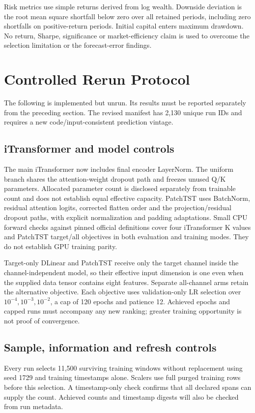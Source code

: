 \documentclass[onecolumn,journal,a4paper,11pt]{IEEEtran}
\begin{document}
Risk metrics use simple returns derived from log wealth. Downside deviation
is the root mean square shortfall below zero over all retained periods,
including zero shortfalls on positive-return periods. Initial capital enters
maximum drawdown. No return, Sharpe, significance or market-efficiency claim
is used to overcome the selection limitation or the forecast-error findings.

\section{Controlled Rerun Protocol}
The following is implemented but unrun. Its results must be reported
separately from the preceding section. The revised manifest has 2,130 unique
run IDs and requires a new code/input-consistent prediction vintage.

\subsection{iTransformer and model controls}
The main iTransformer now includes final encoder LayerNorm. The uniform
branch shares the attention-weight dropout path and freezes unused Q/K
parameters. Allocated parameter count is disclosed separately from trainable
count and does not establish equal effective capacity. PatchTST uses
BatchNorm, residual attention logits, corrected flatten order and the
projection/residual dropout paths, with explicit normalization and padding
adaptations. Small CPU forward checks against pinned official definitions
cover four iTransformer K values and PatchTST target/all objectives in both
evaluation and training modes. They do not establish GPU training parity.

Target-only DLinear and PatchTST receive only the target channel inside the
channel-independent model, so their effective input dimension is one even
when the supplied data tensor contains eight features. Separate all-channel
arms retain the alternative objective. Each objective uses validation-only
LR selection over $10^{-4},10^{-3},10^{-2}$, a cap of 120 epochs and patience
12. Achieved epochs and capped runs must accompany any new ranking; greater
training opportunity is not proof of convergence.

\subsection{Sample, information and refresh controls}
Every run selects 11,500 surviving training windows without replacement
using seed 1729 and training timestamps alone. Scalers use full purged
training rows before this selection. A timestamp-only check confirms that
all declared spans can supply the count. Achieved counts and timestamp
digests will also be checked from run metadata.
\end{document}
